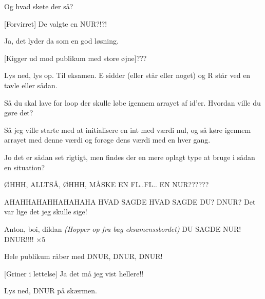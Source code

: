 \documentclass{article}
\begin{document}
\begin{sketch}
Og hvad skete der så?

[Forvirret]
De valgte en NUR?!?!

Ja, det lyder da som en god løsning.

[Kigger ud mod publikum med store øjne]???

\scene{}
Lys ned, lys op.
Til eksamen.
E sidder (eller står eller noget) og R står ved en tavle eller sådan.

Så du skal lave for loop der skulle løbe igennem arrayet af id’er. Hvordan ville du gøre det?

Så jeg ville starte med at initialisere en int med værdi nul, og så køre igennem arrayet med denne værdi og forøge dens værdi med en hver gang.

Jo det er sådan set rigtigt, men findes der en mere oplagt type at bruge i sådan en situation?

ØHHH, ALLTSÅ, ØHHH, MÅSKE EN FL..FL.. EN NUR??????

AHAHHAHAHHAHAHAHA HVAD SAGDE HVAD SAGDE DU? DNUR? Det var lige det jeg skulle sige!

\scene{}
Anton, boi, dildan \textit{(Hopper op fra bag eksamenssbordet)}
DU SAGDE NUR! DNUR!!!! $\times 5$

\scene{}
Hele publikum råber med DNUR, DNUR, DNUR!

[Griner i lettelse]
Ja det må jeg vist hellere!!

 Lys ned, DNUR på skærmen.

\end{sketch}
\end{document}
